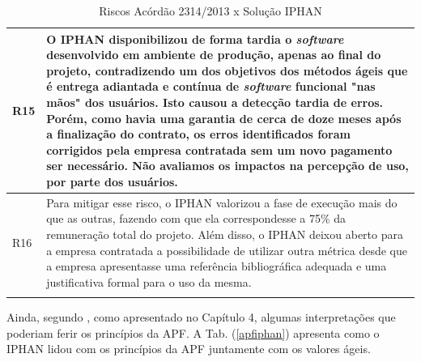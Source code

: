\begin{longtable}{|p{2cm}|p{13cm}|}
R15                                                               & O IPHAN disponibilizou de forma tardia o \textit{software} desenvolvido em ambiente de produção, apenas ao final do projeto, contradizendo um dos objetivos dos métodos ágeis que é entrega adiantada e contínua de \textit{software} funcional "nas mãos" dos usuários. Isto causou a detecção tardia de erros. Porém, como havia uma garantia de cerca de doze meses após a finalização do contrato, os erros identificados foram corrigidos pela empresa contratada sem um novo pagamento ser necessário. Não avaliamos os impactos na percepção de uso, por parte dos usuários.            \\ \hline
R16                                                               &  Para mitigar esse risco, o IPHAN valorizou a fase de execução mais do que as outras, fazendo com que ela correspondesse a 75\% da remuneração total do projeto. Além disso, o IPHAN deixou aberto para a empresa contratada a possibilidade de utilizar outra métrica desde que a empresa apresentasse uma referência bibliográfica adequada e uma justificativa formal para o uso da mesma.              \\ \hline

\caption{Riscos Acórdão 2314/2013 x Solução IPHAN}
		\label{riscosiphan}
\end{longtable}

Ainda, segundo , como apresentado no Capítulo 4, algumas interpretações que poderiam ferir os princípios da APF. A Tab. (\ref{apfiphan}) apresenta como o IPHAN lidou com os princípios da APF juntamente com os valores ágeis.

